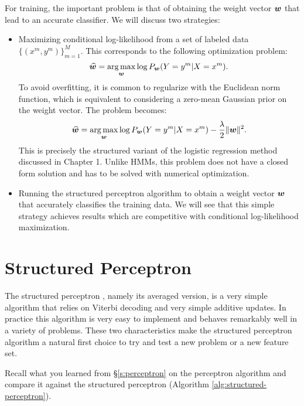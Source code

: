 For training, 
the important problem is that of obtaining the weight vector $\boldsymbol{w}$ that lead to an accurate 
classifier. 
We will discuss two strategies:
\begin{itemize}
\item Maximizing conditional log-likelihood from a set of labeled data $\{(x^m,y^m)\}_{m=1}^M$. This corresponds to the following optimization problem:
\begin{equation}
\widehat{\boldsymbol{w}} = \operatorname*{arg\,max}_{\boldsymbol{w}} \log P_{\boldsymbol{w}}(Y=y^m | X=x^m).
\end{equation}
To avoid overfitting, it is common to regularize with the Euclidean norm function, 
which is equivalent to considering a zero-mean Gaussian prior on the weight vector.
The problem becomes:
\begin{equation}
\widehat{\boldsymbol{w}} = \operatorname*{arg\,max}_{\boldsymbol{w}} \log P_{\boldsymbol{w}}(Y=y^m | X=x^m) - \frac{\lambda}{2} \|\boldsymbol{w}\|^2.
\end{equation}
This is precisely the structured variant of the logistic regression 
method discussed in Chapter 1.
Unlike HMMs, this problem does not have a closed form solution 
and has to be solved with numerical optimization. 
\item Running the structured perceptron algorithm 
to obtain a weight vector $\boldsymbol{w}$ that accurately
classifies the training data. 
We will see that this simple strategy achieves results which are competitive 
with conditional log-likelihood maximization.
\end{itemize}







\section{\label{s:spercetron}Structured Perceptron}

The structured perceptron \citep{collins2002discriminative}, namely its averaged version, is a very simple
algorithm that relies on Viterbi decoding and very simple additive
updates. In practice this algorithm is very easy to implement and
behaves remarkably well in a variety of problems. These two
characteristics make the structured perceptron algorithm a natural
first choice to try and test a new problem or a new feature set. 

Recall what you learned from \S\ref{s:perceptron} on the
perceptron algorithm and compare it against the structured perceptron
(Algorithm \ref{alg:structured-perceptron}). 

